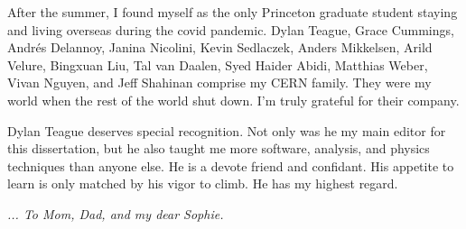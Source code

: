 After the summer, I found myself as the only Princeton graduate student staying and living overseas during the covid pandemic. Dylan Teague,  Grace Cummings, Andrés Delannoy, Janina Nicolini, Kevin Sedlaczek, Anders Mikkelsen, Arild Velure, Bingxuan Liu, Tal van Daalen, Syed Haider Abidi,  Matthias Weber, Vivan Nguyen, and Jeff Shahinan comprise my CERN family. They were my world when the rest of the world shut down. I'm truly grateful for their company. 

Dylan Teague deserves special recognition. Not only was he my main editor for this dissertation, but he also taught me more software, analysis, and physics techniques than anyone else. He is a devote friend and confidant. His appetite to learn is only matched by his vigor to climb. He has my highest regard. 
\newline
\newline
\newline
\newline
\newline

\textit{... To Mom, Dad, and my dear Sophie.}  

